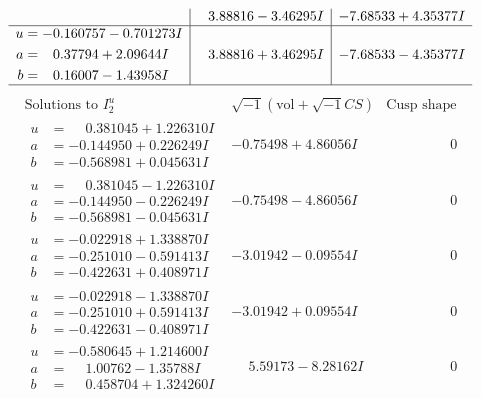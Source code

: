 \documentclass[1p]{elsarticle_modified}
\theoremstyle{definition}
\newcommand{\I}{\sqrt{-1}}
\begin{document}
$$\begin{array}{c|c|c}
 & \phantom{-}3.88816 - 3.46295 I & -7.68533 + 4.35377 I \\ \hline\begin{aligned}
u &= -0.160757 - 0.701273 I \\
a &= \phantom{-}0.37794 + 2.09644 I \\
b &= \phantom{-}0.16007 - 1.43958 I\end{aligned}
 & \phantom{-}3.88816 + 3.46295 I & -7.68533 - 4.35377 I\\
 \hline 
 \end{array}$$\newpage$$\begin{array}{c|c|c}  
\text{Solutions to }I^u_{2}& \I (\text{vol} + \sqrt{-1}CS) & \text{Cusp shape}\\
 \hline 
\begin{aligned}
u &= \phantom{-}0.381045 + 1.226310 I \\
a &= -0.144950 + 0.226249 I \\
b &= -0.568981 + 0.045631 I\end{aligned}
 & -0.75498 + 4.86056 I & \phantom{-0.000000 } 0 \\ \hline\begin{aligned}
u &= \phantom{-}0.381045 - 1.226310 I \\
a &= -0.144950 - 0.226249 I \\
b &= -0.568981 - 0.045631 I\end{aligned}
 & -0.75498 - 4.86056 I & \phantom{-0.000000 } 0 \\ \hline\begin{aligned}
u &= -0.022918 + 1.338870 I \\
a &= -0.251010 - 0.591413 I \\
b &= -0.422631 + 0.408971 I\end{aligned}
 & -3.01942 - 0.09554 I & \phantom{-0.000000 } 0 \\ \hline\begin{aligned}
u &= -0.022918 - 1.338870 I \\
a &= -0.251010 + 0.591413 I \\
b &= -0.422631 - 0.408971 I\end{aligned}
 & -3.01942 + 0.09554 I & \phantom{-0.000000 } 0 \\ \hline\begin{aligned}
u &= -0.580645 + 1.214600 I \\
a &= \phantom{-}1.00762 - 1.35788 I \\
b &= \phantom{-}0.458704 + 1.324260 I\end{aligned}
 & \phantom{-}5.59173 - 8.28162 I & \phantom{-0.000000 } 0 \\ \hline\begin{aligned}

\end{aligned}
\end{array}$$
\end{document}
